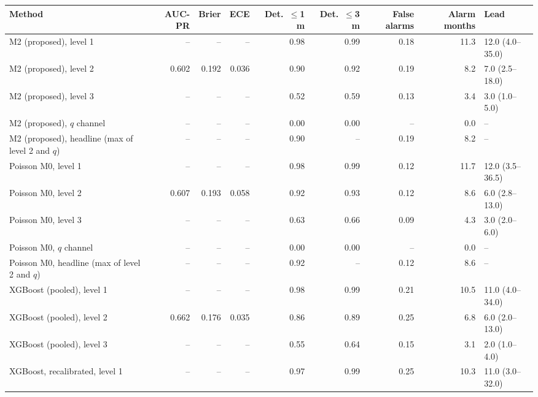 \noindent\begin{minipage}{\linewidth}
\label{tab:S26_3}
\centering\tiny
\begin{tabular}{lrrrrrrrl}
\toprule
Method & AUC-PR & Brier & ECE & Det.\ $\leq$1 m & Det.\ $\leq$3 m & False alarms & Alarm months & Lead \\ \midrule
M2 (proposed), level 1 & -- & -- & -- & 0.98 & 0.99 & 0.18 & 11.3 & 12.0 (4.0--35.0) \\
M2 (proposed), level 2 & 0.602 & 0.192 & 0.036 & 0.90 & 0.92 & 0.19 & 8.2 & 7.0 (2.5--18.0) \\
M2 (proposed), level 3 & -- & -- & -- & 0.52 & 0.59 & 0.13 & 3.4 & 3.0 (1.0--5.0) \\
M2 (proposed), $q$ channel & -- & -- & -- & 0.00 & 0.00 & -- & 0.0 & -- \\
M2 (proposed), headline (max of level 2 and $q$) & -- & -- & -- & 0.90 & -- & 0.19 & 8.2 & -- \\
Poisson M0, level 1 & -- & -- & -- & 0.98 & 0.99 & 0.12 & 11.7 & 12.0 (3.5--36.5) \\
Poisson M0, level 2 & 0.607 & 0.193 & 0.058 & 0.92 & 0.93 & 0.12 & 8.6 & 6.0 (2.8--13.0) \\
Poisson M0, level 3 & -- & -- & -- & 0.63 & 0.66 & 0.09 & 4.3 & 3.0 (2.0--6.0) \\
Poisson M0, $q$ channel & -- & -- & -- & 0.00 & 0.00 & -- & 0.0 & -- \\
Poisson M0, headline (max of level 2 and $q$) & -- & -- & -- & 0.92 & -- & 0.12 & 8.6 & -- \\
XGBoost (pooled), level 1 & -- & -- & -- & 0.98 & 0.99 & 0.21 & 10.5 & 11.0 (4.0--34.0) \\
XGBoost (pooled), level 2 & 0.662 & 0.176 & 0.035 & 0.86 & 0.89 & 0.25 & 6.8 & 6.0 (2.0--13.0) \\
XGBoost (pooled), level 3 & -- & -- & -- & 0.55 & 0.64 & 0.15 & 3.1 & 2.0 (1.0--4.0) \\
XGBoost, recalibrated, level 1 & -- & -- & -- & 0.97 & 0.99 & 0.25 & 10.3 & 11.0 (3.0--32.0) \\

\end{tabular}
\end{minipage}
